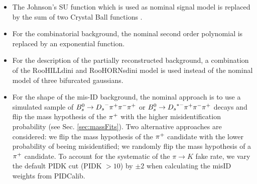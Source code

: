 \begin{itemize}

\item The \textsf{Johnson's SU} function which is used as nominal signal model is replaced by the sum of two \textsf{Crystal Ball} functions \cite{CB}. 

\item For the combinatorial background, the nominal second order polynomial is replaced by an exponential function. 

\item For the description of the partially reconstructed background, 
a combination of the \textsf{RooHILLdini} and \textsf{RooHORNsdini} model \cite{Hill:2253246} is used instead of the nominal model of three bifurcated gaussians. 

\item For the shape of the mis-ID background, 
the nominal approach is to use a simulated sample of ${{B}^0_{s}}\rightarrow{\ensuremath{{D}_{s}}}^{-}{{\pi}^+}{{\pi}^-}{{\pi}^+}$ or ${{B}^0_{s}}\rightarrow{\ensuremath{{D}_{s}}}^{*-}{{\pi}^+}{{\pi}^-}{{\pi}^+}$ 
decays and flip the mass hypothesis of the ${{\pi}^+}$ with the higher misidentification probability (see Sec. \ref{sec:massFits}). 
Two alternative approaches are considered:
we flip the mass hypothesis of the ${{\pi}^+}$ candidate with the lower probability of beeing misidentified; we randomly flip the mass hypothesis of a ${{\pi}^+}$ candidate.
To account for the systematic of the $\pi \to K$ fake rate, we 
vary the default PIDK cut (PIDK $> 10$) by $\pm 2$ when calculating the misID weights from \textsf{PIDCalib}.

\end{itemize}
